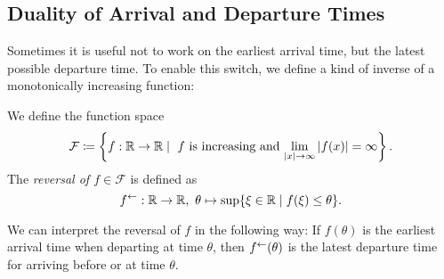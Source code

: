 \subsection{Duality of Arrival and Departure Times}

Sometimes it is useful not to work on the earliest arrival time, but the latest possible departure time.
To enable this switch, we define a kind of inverse of a monotonically increasing function:

\newcommand{\IncCoercive}{\mathcal{F}}
\begin{definition}
    We define the function space 
    \[
        \IncCoercive \coloneqq \left\{ f:\R \rightarrow \R \mid \text{ $f$ is increasing and $ \lim_{\abs{x}\rightarrow\infty} \abs{f(x)} = \infty$} \right\}.
    \]
    The \emph{reversal of $f\in\IncCoercive$} is defined as 
    \[
        \minv{f}:\R \rightarrow \R,\ \theta\mapsto \sup \{ \xi\in\R \mid f(\xi) \leq \theta \}.
    \]
\end{definition}

We can interpret the reversal of $f$ in the following way:
If $f(\theta)$ is the earliest arrival time when departing at time $\theta$, then $f^{\leftarrow}(\theta)$ is the latest departure time for arriving before or at time $\theta$.

